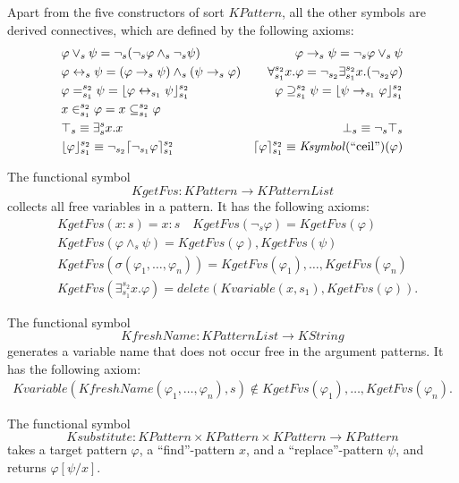 \documentclass[UTF8,11pt]{article}
\theoremstyle{plain}
\theoremstyle{definition}
\theoremstyle{remark}
\newcommand{\cln}{{:}}
\DeclarePairedDelimiter{\ceil}{\lceil}{\rceil}
\DeclarePairedDelimiter{\floor}{\lfloor}{\rfloor}
\newcommand{\KString}{\mathit{KString}}
\newcommand{\Ksymbol}{\mathit{Ksymbol}}
\newcommand{\KPattern}{\mathit{KPattern}}
\newcommand{\KPatternList}{\mathit{KPatternList}}
\newcommand{\Kvariable}{\mathit{Kvariable}}
\newcommand{\kand}{\wedge}
\newcommand{\kor}{\vee}
\newcommand{\kimplies}{\to}
\newcommand{\kiff}{\leftrightarrow}
\newcommand{\knot}{\neg}
\newcommand{\kexists}{\exists}
\newcommand{\kforall}{\forall}
\newcommand{\kequals}{=}
\newcommand{\kcontains}{\supseteq}
\newcommand{\kfloor}{\floor}
\newcommand{\kceil}{\ceil}
\newcommand{\ktop}{\top}
\newcommand{\kbottom}{\bot}
\newcommand{\KgetFvs}{\mathit{KgetFvs}}
\newcommand{\KfreshName}{\mathit{KfreshName}}
\newcommand{\Ksubstitute}{\mathit{Ksubstitute}}
\newcommand{\quot}[1]{\mathrm{``#1"}}
\begin{document}
Apart from the five constructors of sort $\KPattern$, all the other symbols are derived connectives, which are defined by the following axioms:
\begin{align*}
&\varphi \kor_s \psi = \knot_s(\knot_s \varphi \kand_s \knot_s \psi)
&\varphi \kimplies_s \psi = \knot_s \varphi \kor_s \psi
\\
&\varphi \kiff_s \psi = (\varphi \kimplies_s \psi) \kand_s (\psi \kimplies_s \varphi)
&\kforall_{s_1}^{s_2}x.\varphi = \knot_{s_2} \kexists_{s_1}^{s_2} x. (\knot_{s_2} \varphi)
\\
&\varphi \kequals_{s_1}^{s_2} \psi = \kfloor{\varphi \kiff_{s_1} \psi}_{s_1}^{s_2}
&\varphi \kcontains_{s_1}^{s_2} \psi = \kfloor{\psi \kimplies_{s_1} \varphi}_{s_1}^{s_2}
\\
&x \in_{s_1}^{s_2} \varphi = x \subseteq_{s_1}^{s_2} \varphi
\\
&\ktop_s \equiv \kexists_s^s x . x
&\kbottom_s \equiv \knot_s \ktop_s
\\
&\kfloor{\varphi}_{s_1}^{s_2} \equiv \knot_{s_2} \kceil{\knot_{s_1} \varphi}_{s_1}^{s_2}
&\kceil{\varphi}_{s_1}^{s_2} \equiv \Ksymbol(\quot{ceil})(\varphi)
\end{align*}

The functional symbol 
$$\KgetFvs \colon \KPattern \to \KPatternList$$
collects all free variables in a pattern. 
It has the following axioms:
\begin{align*}
&\KgetFvs(x \cln s) = x \cln s \quad \KgetFvs(\knot_s \varphi) = 
\KgetFvs(\varphi)
\\
&\KgetFvs(\varphi \kand_s \psi) = \KgetFvs(\varphi), \KgetFvs(\psi)
\\
&\KgetFvs(\sigma(\varphi_1, \dots, \varphi_n)) = \KgetFvs(\varphi_1), \dots, \KgetFvs(\varphi_n)
\\
&\KgetFvs(\kexists_{s_1}^{s_2} x . \varphi) = \mathit{delete}(\Kvariable(x, 
s_1), \KgetFvs(\varphi)).
\end{align*}

The functional symbol
$$\KfreshName \colon \KPatternList \to \KString$$ 
generates a variable name that does not occur free in the argument patterns.
It has the following axiom:
\begin{align*}
\Kvariable(\KfreshName(\varphi_1,\dots,\varphi_n), s) \not\in \KgetFvs(\varphi_1),\dots,\KgetFvs(\varphi_n).
\end{align*}

The functional symbol
$$\Ksubstitute \colon \KPattern \times \KPattern \times \KPattern \to \KPattern$$
takes a target pattern $\varphi$, a ``find''-pattern $x$, and a ``replace''-pattern $\psi$, and returns $\varphi[\psi / x]$.
\end{document}

